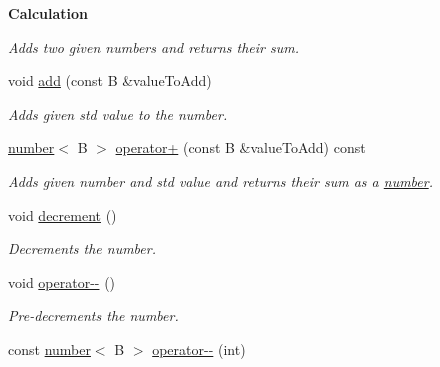 \begin{Indent}{\bf Calculation}
\begin{DoxyCompactItemize}
\begin{DoxyCompactList}\small\item\em Adds two given numbers and returns their sum. \end{DoxyCompactList}\item 
void \hyperlink{classcjr_1_1number_a4a3990a55896edfa85639c57d8c3c699}{add} (const B \&value\-To\-Add)
\begin{DoxyCompactList}\small\item\em Adds given std value to the number. \end{DoxyCompactList}\item 
\hypertarget{classcjr_1_1number_af4753e77a4277f4290219e4e91763d8c}{\hyperlink{classcjr_1_1number}{number}$<$ B $>$ \hyperlink{classcjr_1_1number_af4753e77a4277f4290219e4e91763d8c}{operator+} (const B \&value\-To\-Add) const }\label{classcjr_1_1number_af4753e77a4277f4290219e4e91763d8c}

\begin{DoxyCompactList}\small\item\em Adds given number and std value and returns their sum as a \hyperlink{classcjr_1_1number}{number}. \end{DoxyCompactList}\item 
\hypertarget{classcjr_1_1number_a26eef97a8cbcf837b65e7dda206e623d}{void \hyperlink{classcjr_1_1number_a26eef97a8cbcf837b65e7dda206e623d}{decrement} ()}\label{classcjr_1_1number_a26eef97a8cbcf837b65e7dda206e623d}

\begin{DoxyCompactList}\small\item\em Decrements the number. \end{DoxyCompactList}\item 
\hypertarget{classcjr_1_1number_a2ffbd3e053d87dd7d53381df55111a79}{void \hyperlink{classcjr_1_1number_a2ffbd3e053d87dd7d53381df55111a79}{operator-\/-\/} ()}\label{classcjr_1_1number_a2ffbd3e053d87dd7d53381df55111a79}

\begin{DoxyCompactList}\small\item\em Pre-\/decrements the number. \end{DoxyCompactList}\item 
\hypertarget{classcjr_1_1number_a53449243aa05abff7e091030de0e3028}{const \hyperlink{classcjr_1_1number}{number}$<$ B $>$ \hyperlink{classcjr_1_1number_a53449243aa05abff7e091030de0e3028}{operator-\/-\/} (int)}\label{classcjr_1_1number_a53449243aa05abff7e091030de0e3028}


\end{DoxyCompactItemize}
\end{Indent}
